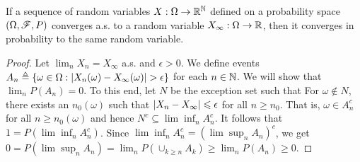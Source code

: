 \documentclass[letterpaper,10pt,english]{article}
\begin{document}
\begin{thm} 
If a sequence of random variables $X: \Omega \to \mathbb{R}^{\mathbb{N}}$ defined on a probability space $(\Omega, \mathscr{F}, P)$ converges a.s. to a random variable $X_\infty:\Omega\to\mathbb{R}$, then it converges in probability to the same random variable.  
\end{thm}
\begin{proof}  
Let $\lim_nX_n = X_\infty$ a.s. and $\epsilon > 0$. 
We define events $A_n \triangleq \left\{\omega \in \Omega: \left\lvert X_n(\omega)-X_\infty(\omega)\right\rvert > \epsilon\right\}$ for each $n \in \mathbb{N}$. 
We will show that %
$\lim_nP(A_n) = 0$. 
To this end, let $N$ be the exception set such that 
For $\omega \notin N$, there exists an $n_0(\omega)$ such that $\left\lvert X_n-X_\infty\right\rvert \leqslant  \epsilon$ for all $n \ge n_0$. 
That is, $\omega \in A_n^c$ for all $n \ge n_0(\omega)$ and hence $N^c \subseteq \lim\inf_nA_n^c$. 
It follows that $1 = P(\lim\inf_nA_n^c)$.   
Since  $\lim\inf_nA_n^c = (\lim\sup_nA_n)^c$, we get 
$0 = P(\lim\sup_nA_n) = \lim_nP(\cup_{k \ge n}A_k) \ge \lim_nP(A_n) \ge 0.$
\end{proof}
\end{document}
